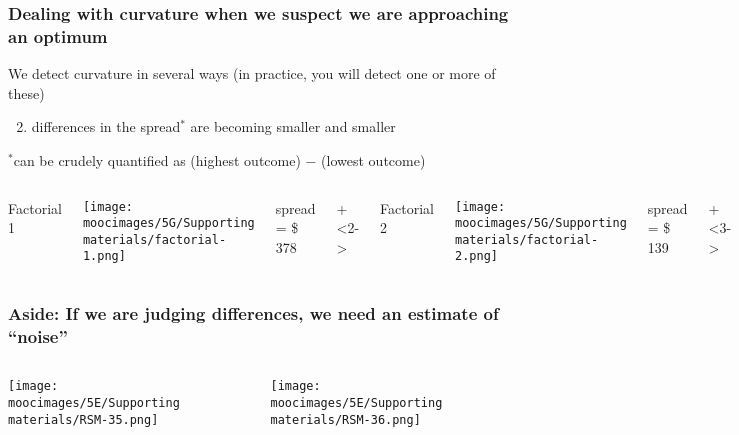 \documentclass[handout,11pt,aspectratio=169,mathserif]{beamer}
\begin{document}
\begin{frame}\frametitle{Dealing with curvature when we suspect we are approaching an optimum}
	{\color{myOrange}We detect curvature in several ways (in practice, you will detect one or more of these)}
	
	\vspace{.7cm}
	\begin{enumerate}\setcounter{enumi}{1}
		\item	differences in the {\color{myGreen} spread}$^\ast$ are becoming smaller and smaller
	\end{enumerate}
	
	\vspace{.3cm}
	$^\ast${\color{myGreen}\scriptsize can be crudely quantified as (highest outcome) $-$ (lowest outcome)}
	\vspace{.5cm}
	\begin{columns}[T]
			Factorial 1
			
			\vspace{.5cm}
			\centerline{\texttt{[image: \\moocimages/5G/Supporting materials/factorial-1.png]}}
			
			spread = \$ 378
		
			\onslide+<2->{
				Factorial 2 
			
				\vspace{.5cm}
				\centerline{\texttt{[image: \\moocimages/5G/Supporting materials/factorial-2.png]}}
			
				spread = \$ 139
			}
			\onslide+<3->{
				Factorial 3
				
				\vspace{.5cm}
				\centerline{\texttt{[image: \\moocimages/5G/Supporting materials/factorial-3.png]}}
			
				\vspace{0.4cm}
				spread = \$ 20
			}
	\end{columns}
	
\end{frame}

\begin{frame}\frametitle{{\color{red} Aside}: If we are judging differences, we need an estimate of ``noise''}
	\begin{columns}[T]
			\centerline{\texttt{[image: \\moocimages/5E/Supporting materials/RSM-35.png]}}
			\centerline{\texttt{[image: \\moocimages/5E/Supporting materials/RSM-36.png]}}
	\end{columns}	
\end{frame}
\end{document}
